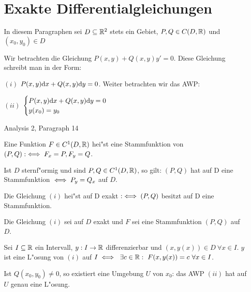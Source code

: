 \documentclass[a4paper,twoside,DIV15,BCOR12mm]{scrbook}
\begin{document}
\chapter{Exakte Differentialgleichungen}

\begin{vereinbarung}
In diesem Paragraphen sei $D\subseteq\mathbb{R}^2$ stets ein Gebiet, $P, Q\in C(D,\mathbb{R})$
und $(x_0, y_0)\in D$
\end{vereinbarung}
Wir betrachten die Gleichung $P(x,y)+Q(x,y)y'=0$. Diese Gleichung schreibt
man in der Form:
\begin{liste}
\item[$(i)$] $P(x,y)\mathrm{d} x + Q(x,y)\mathrm{d} y =0$. Weiter betrachten wir das AWP:
\item[$(ii)$] $\begin{cases}P(x,y)\mathrm{d} x + Q(x,y)\mathrm{d} y=0 \\ y(x_0)=y_0\end{cases}$
\end{liste}

\begin{erinnerung}
Analysis 2, Paragraph 14
\begin{liste}
\item Eine Funktion $F\in C^1(D,\mathbb{R})$ hei"st eine Stammfunktion von $(P, Q):\iff F_x=P, F_y=Q$.
\item Ist $D$ sternf"ormig und sind $P, Q\in C^1(D,\mathbb{R})$, so gilt: $(P, Q)$ hat auf D eine Stammfunktion
$\iff P_y=Q_x$ auf $D$.
\end{liste}
\end{erinnerung}

\begin{definition}
Die Gleichung $(i)$ hei"st auf D exakt $:\iff (P,Q)$ besitzt auf D eine Stammfunktion.
\end{definition}

\begin{satz*}
Die Gleichung $(i)$ sei auf $D$ exakt und $F$ sei eine Stammfunktion $(P, Q)$ auf $D$.
\begin{liste}
\item Sei $I\subseteq\mathbb{R}$ ein Intervall, $y:I\to\mathbb{R}$ differenzierbar und $(x, y(x))\in D\ \forall x\in I$.
$y$ ist eine L"osung von $(i)$ auf $I\equizu\ \exists c\in\MdR:\ F(x,y(x))=c\ \forall x\in I$.
\item Ist $Q(x_0, y_0)\ne 0$, so existiert eine Umgebung $U$ von $x_0$: das AWP $(ii)$ hat auf $U$
genau eine L"osung.
\end{liste}
\end{satz*}
\end{document}
